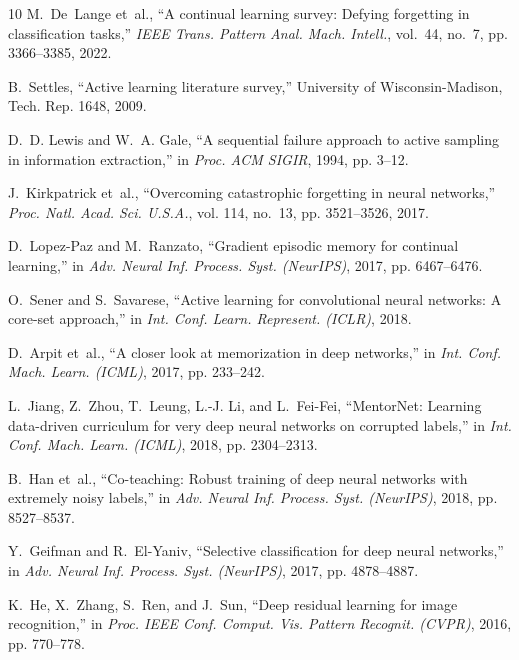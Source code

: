 \documentclass[journal,10pt,twocolumn]{article}
\begin{document}
\begin{thebibliography}{10}
M.~De~Lange et~al., ``A continual learning survey: Defying forgetting in classification tasks,'' \emph{IEEE Trans. Pattern Anal. Mach. Intell.}, vol.~44, no.~7, pp. 3366--3385, 2022.

B.~Settles, ``Active learning literature survey,'' University of Wisconsin-Madison, Tech. Rep. 1648, 2009.

D.~D. Lewis and W.~A. Gale, ``A sequential failure approach to active sampling in information extraction,'' in \emph{Proc. ACM SIGIR}, 1994, pp. 3--12.

J.~Kirkpatrick et~al., ``Overcoming catastrophic forgetting in neural networks,'' \emph{Proc. Natl. Acad. Sci. U.S.A.}, vol. 114, no.~13, pp. 3521--3526, 2017.

D.~Lopez-Paz and M.~Ranzato, ``Gradient episodic memory for continual learning,'' in \emph{Adv. Neural Inf. Process. Syst. (NeurIPS)}, 2017, pp. 6467--6476.

O.~Sener and S.~Savarese, ``Active learning for convolutional neural networks: A core-set approach,'' in \emph{Int. Conf. Learn. Represent. (ICLR)}, 2018.

D.~Arpit et~al., ``A closer look at memorization in deep networks,'' in \emph{Int. Conf. Mach. Learn. (ICML)}, 2017, pp. 233--242.

L.~Jiang, Z.~Zhou, T.~Leung, L.-J. Li, and L.~Fei-Fei, ``MentorNet: Learning data-driven curriculum for very deep neural networks on corrupted labels,'' in \emph{Int. Conf. Mach. Learn. (ICML)}, 2018, pp. 2304--2313.

B.~Han et~al., ``Co-teaching: Robust training of deep neural networks with extremely noisy labels,'' in \emph{Adv. Neural Inf. Process. Syst. (NeurIPS)}, 2018, pp. 8527--8537.

Y.~Geifman and R.~El-Yaniv, ``Selective classification for deep neural networks,'' in \emph{Adv. Neural Inf. Process. Syst. (NeurIPS)}, 2017, pp. 4878--4887.

K.~He, X.~Zhang, S.~Ren, and J.~Sun, ``Deep residual learning for image recognition,'' in \emph{Proc. IEEE Conf. Comput. Vis. Pattern Recognit. (CVPR)}, 2016, pp. 770--778.
\end{thebibliography}
\end{document}
